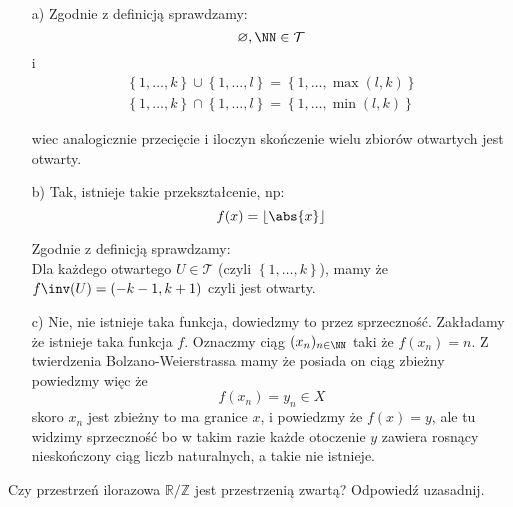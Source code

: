 \documentclass[11pt]{scrartcl}
\begin{document}
        \begin{itemize}
          \item[a)] Zgodnie z definicją sprawdzamy:
            \[
                \varnothing, \NN \in \mathcal{T}
            \]
            i 
            \begin{gather*}
                \left \{ 1, \dots, k \right \} \cup \left \{ 1, \dots, l \right \} = \left \{ 1, \dots, \max (l,k) \right \} \\
                \left \{ 1, \dots, k \right \} \cap \left \{ 1, \dots, l \right \} = \left \{ 1, \dots, \min (l,k) \right \}
              \end{gather*}

            wiec analogicznie przecięcie i iloczyn skończenie wielu zbiorów otwartych jest otwarty.
          \item[b)]
            Tak, istnieje takie przekształcenie, np:
            \[
                f (x) = \lfloor \abs{x} \rfloor 
            \]
            
            Zgodnie z definicją sprawdzamy: \\
            Dla każdego otwartego $U \in \mathcal{T}$ (czyli $\left \{ 1, \dots, k \right \}$), mamy że $f \inv (U) = (-k-1 , k+1)$ czyli jest otwarty.            

          \item[c)]
            Nie, nie istnieje taka funkcja, dowiedzmy to przez sprzeczność. Zakładamy że istnieje taka funkcja $f$.
            Oznaczmy ciąg $(x_n)_{n \in \NN}$ taki że $f(x_n) = n$. Z twierdzenia Bolzano-Weierstrassa mamy że posiada on ciąg zbieżny powiedzmy więc że
            \[
                f(x_n) = y_n \in X
            \]
            skoro $x_n$ jest zbieżny to ma granice $x$, i powiedzmy że $f(x) = y$, ale tu widzimy sprzeczność bo w takim razie każde otoczenie $y$ zawiera rosnący nieskończony ciąg liczb naturalnych, a takie nie istnieje. 
            
        \end{itemize}
        


        
    \begin{zadanie*}
        Czy przestrzeń ilorazowa $\mathbb{R} / \mathbb{Z}$ jest przestrzenią zwartą? Odpowiedź uzasadnij.
    \end{zadanie*}

    \begin{center}
    \end{center}
\end{document}
